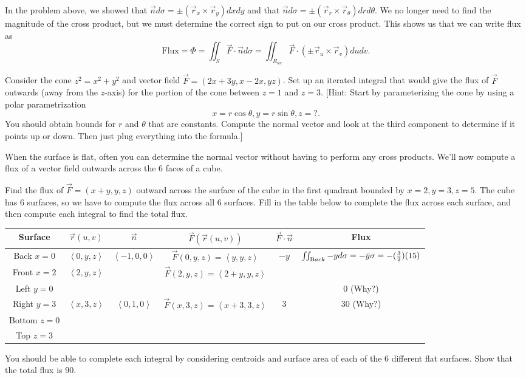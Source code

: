 In the problem above, we showed that $\vec n d\sigma = \pm(\vec r_x\times\vec r_y)dxdy$ and that $\vec n d\sigma = \pm(\vec r_r\times\vec r_\theta)drd\theta$.  We no longer need to find the magnitude of the cross product, but we must determine the correct sign to put on our cross product.  This shows us that we can write flux as 
$$\text{Flux}=\Phi 
= \iint_S \vec F\cdot \vec n d\sigma 
= \iint_{R_{uv}} \vec F\cdot (\pm \vec r_u\times \vec r_v) dudv
.$$



\begin{problem}
 Consider the cone $z^2=x^2+y^2$ and vector field $\vec F = (2x+3y, x-2x, yz)$. Set up an iterated integral that would give the flux of $\vec F$ outwards (away from the $z$-axis) for the portion of the cone between $z=1$ and $z=3$. [Hint: Start by  parameterizing the cone by using a polar parametrization $$x=r\cos\theta, y=r\sin\theta, z=?.$$ You should obtain bounds for $r$ and $\theta$ that are constants.  Compute the normal vector and look at the third component to determine if it points up or down.  Then just plug everything into the formula.]
\end{problem}




When the surface is flat, often you can determine the normal vector without having to perform any cross products.  We'll now compute a flux of a vector field outwards across the 6 faces of a cube. 

\begin{problem} 

Find the flux of $ \vec F=(x+y,y,z) $ outward across the surface of the cube in the first quadrant bounded by {$ x=2,y=3,z=5 $}. The cube has 6 surfaces, so we have to compute the flux across all 6 surfaces. Fill in the table below to complete the flux across each surface, and then compute each integral to find the total flux. 
\begin{center}
\begin{tabular}{|c|c|c|c|c|c|}
\hline
Surface&$\vec r(u,v)$ & $\vec n$ & $\vec F(\vec r(u,v))$ & $\vec F\cdot \vec n$  & Flux\\\hline
Back $x=0$&$ \left<0,y,z\right>$   & $ \left<-1,0,0\right>$ & $\vec F(0,y,z) = \left<y,y,z\right>$ & $-y$&  $\iint_{\text Back} -y d\sigma = -\bar y \sigma=-(\frac{3}{2})(15)$\\\hline
Front $x=2$& $ \left<2,y,z\right>$ &  & $\vec F(2,y,z) = \left<2+y,y,z\right>$ &  & \\\hline
Left $y=0$&     & &  & &  $0$ (Why?)\\\hline
Right $y=3$&   $ \left<x,3,z\right>$      & $ \left<0,1,0\right>$  & $\vec F(x,3,z) = \left<x+3,3,z\right>$ & 3 & 30 (Why?) \\\hline
Bottom $z=0$&     & &  & & \\\hline
Top $z=3$&    & &  & & \\\hline
\end{tabular} 
\end{center}
You should be able to complete each integral by considering centroids and surface area of each of the 6 different flat surfaces. Show that the total flux is 90. 
\end{problem}

